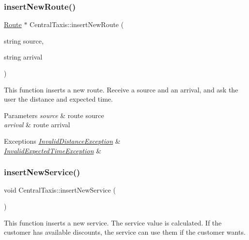\subsubsection{\texorpdfstring{insert\+New\+Route()}{insertNewRoute()}\hspace{0.1cm}{\footnotesize\ttfamily [2/2]}}
{\footnotesize\ttfamily \hyperlink{classRoute}{Route} $\ast$ Central\+Taxis\+::insert\+New\+Route (\begin{DoxyParamCaption}\item[{string}]{source,  }\item[{string}]{arrival }\end{DoxyParamCaption})}

This function inserts a new route. Receive a source and an arrival, and ask the user the distance and expected time. 
\begin{DoxyParams}{Parameters}
{\em source} & route source \\
\hline
{\em arrival} & route arrival \\
\hline
\end{DoxyParams}

\begin{DoxyExceptions}{Exceptions}
{\em \hyperlink{classInvalidDistanceException}{Invalid\+Distance\+Exception}} & \\
\hline
{\em \hyperlink{classInvalidExpectedTimeException}{Invalid\+Expected\+Time\+Exception}} & \\
\hline
\end{DoxyExceptions}
\hypertarget{classCentralTaxis_a92ab1cf8aae3e4344d10a6ec35b602ba}{}\label{classCentralTaxis_a92ab1cf8aae3e4344d10a6ec35b602ba} 
\subsubsection{\texorpdfstring{insert\+New\+Service()}{insertNewService()}}
{\footnotesize\ttfamily void Central\+Taxis\+::insert\+New\+Service (\begin{DoxyParamCaption}{ }\end{DoxyParamCaption})}

This function inserts a new service. The service value is calculated. If the customer has available discounts, the service can use them if the customer wants. \hypertarget{classCentralTaxis_a487d12631006ffef10f96d8dd74a1bf5}{}\label{classCentralTaxis_a487d12631006ffef10f96d8dd74a1bf5} 
